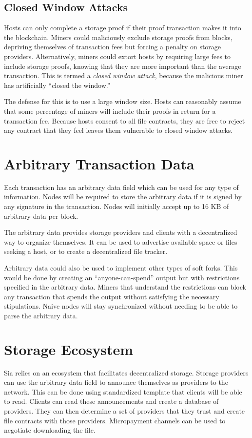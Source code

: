 \documentclass[twocolumn]{article}
\begin{document}
\subsection{Closed Window Attacks}
Hosts can only complete a storage proof if their proof transaction makes it into the blockchain.
Miners could maliciously exclude storage proofs from blocks, depriving themselves of transaction fees but forcing a penalty on storage providers.
Alternatively, miners could extort hosts by requiring large fees to include storage proofs, knowing that they are more important than the average transaction.
This is termed a \textit{closed window attack}, because the malicious miner has artificially ``closed the window.''

The defense for this is to use a large window size.
Hosts can reasonably assume that some percentage of miners will include their proofs in return for a transaction fee.
Because hosts consent to all file contracts, they are free to reject any contract that they feel leaves them vulnerable to closed window attacks.

\section{Arbitrary Transaction Data}
Each transaction has an arbitrary data field which can be used for any type of information.
Nodes will be required to store the arbitrary data if it is signed by any signature in the transaction.
Nodes will initially accept up to 16 KB of arbitrary data per block.

The arbitrary data provides storage providers and clients with a decentralized way to organize themselves.
It can be used to advertise available space or files seeking a host, or to create a decentralized file tracker.

Arbitrary data could also be used to implement other types of soft forks.
This would be done by creating an ``anyone-can-spend'' output but with restrictions specified in the arbitrary data.
Miners that understand the restrictions can block any transaction that spends the output without satisfying the necessary stipulations.
Naive nodes will stay synchronized without needing to be able to parse the arbitrary data.

\section{Storage Ecosystem}
Sia relies on an ecosystem that facilitates decentralized storage.
Storage providers can use the arbitrary data field to announce themselves as providers to the network.
This can be done using standardized template that clients will be able to read.
Clients can read these announcements and create a database of providers.
They can then determine a set of providers that they trust and create file contracts with those providers.
Micropayment channels \cite{mpc} can be used to negotiate downloading the file. %
\end{document}
